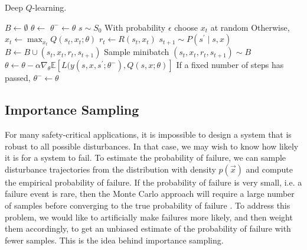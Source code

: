 \begin{algorithm}
\caption{Deep $Q$-learning.} \label{alg:dqn}
\begin{algorithmic}[1]
    \State $B \gets \emptyset$ \label{line:dqn_initialize_buffer}
    \State $\theta \gets$  \label{line:dqn_initialize_weights}
    \State $\theta^- \gets \theta$
    \Loop
        \State $s \sim S_0$ \label{line:dqn_sample_ic}
         \label{line:dqn_loop_episode}
            \State With probability $\epsilon$ choose $x_t$ at random \label{line:dqn_rand_action}
            \State Otherwise, $x_t \gets \max_{x_t} Q(s_t, x_t; \theta)$ \label{line:dqn_greedy_action}
            \State $r_t \gets R(s_t, x_t)$ \label{line:dqn_reward}
            \State $s_{t+1} \sim P(s^\prime \mid s, x)$ \label{line:dqn_next_state}
            \State $B \gets B \cup (s_t, x_t, r_t, s_{t+1})$ \label{line:dqn_save_in_replay_buffer}
            \State Sample minibatch $(s_t, x_t, r_t, s_{t+1}) \sim B$ \label{line:dqn_minibatch}
            \State $\theta \gets \theta - \alpha \nabla_{\theta} \mathbb{E}[L(y(s, x, s^\prime; \theta^-), Q(s,x; \theta)]$ \label{line:dqn_update}
            \State If a fixed number of steps has passed, $\theta^- \gets \theta$ \label{line:dqn_target_update}
        \EndWhile
    \EndLoop
    \State \Return{\theta} \label{line:dqn_return}
    \EndFunction
\end{algorithmic}
\end{algorithm}

\subsection{Importance Sampling}
\label{sec:is}
For many safety-critical applications, it is impossible to design a system that is robust to all possible disturbances. In that case, we may wish to know how likely it is for a system to fail. To estimate the probability of failure, we can sample disturbance trajectories from the distribution with density $p(\vec{x})$ and compute the empirical probability of failure. If the probability of failure is very small, i.e. a failure event is rare, then the Monte Carlo approach will require a large number of samples before converging to the true probability of failure \cite{hahn1972sample}. To address this problem, we would like to artificially make failures more likely, and then weight them accordingly, to get an unbiased estimate of the probability of failure with fewer samples. This is the idea behind importance sampling.


